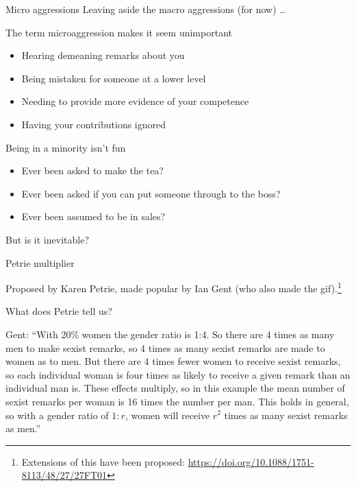 \documentclass[xcolor=table,aspectratio=169]{beamer}
\begin{document}
\begin{frame}{Micro aggressions}
	Leaving aside the macro aggressions (for now) \ldots
	
	\vspace{0.5em}

	The term microaggression makes it seem unimportant

	\begin{itemize}
		\item Hearing demeaning remarks about you
		\item Being mistaken for someone at a lower level
		\item Needing to provide more evidence of your competence
		\item Having your contributions ignored
	\end{itemize}
\end{frame}


\begin{frame}{Being in a minority isn't fun }
	\begin{itemize}
		\item Ever been asked to make the tea?
			\pause
		\item Ever been asked if you can put someone through to the boss?
			\pause
		\item Ever been assumed to be in sales?
	\end{itemize}
But is it inevitable?
\end{frame}

\begin{frame}{Petrie multiplier}
	\transduration<0-71>{0}
				
			Proposed by Karen Petrie, made popular by Ian Gent (who also made the gif).\footnote{Extensions of this have been proposed: \url{https://doi.org/10.1088/1751-8113/48/27/27FT01}}
\end{frame}

\begin{frame}{What does Petrie tell us?}

	Gent: ``With 20\% women the gender ratio is 1:4. So there are 4 times as many men to make sexist remarks, so 4 times as many sexist remarks are made to women as to men. But there are 4 times fewer women to receive sexist remarks, so each individual woman is four times as likely to receive a given remark than an individual man is. These effects multiply, so in this example the mean number of sexist remarks per woman is 16 times the number per man. This holds in general, so with a gender ratio of $1:r$, women will receive $r^{2}$ times as many sexist remarks as men.''
\end{frame}
\end{document}
